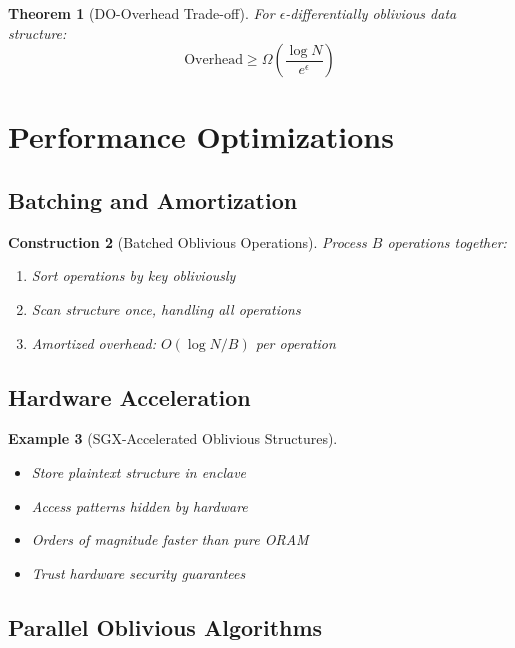 \documentclass[11pt,final]{article}
\newtheorem{theorem}{Theorem}[section]
\newtheorem{example}[theorem]{Example}
\newtheorem{construction}[theorem]{Construction}
\begin{document}
\begin{theorem}[DO-Overhead Trade-off]
For $\epsilon$-differentially oblivious data structure:
\begin{equation}
\text{Overhead} \geq \Omega\left(\frac{\log N}{e^\epsilon}\right)
\end{equation}
\end{theorem}

\section{Performance Optimizations}

\subsection{Batching and Amortization}

\begin{construction}[Batched Oblivious Operations]
Process $B$ operations together:
\begin{enumerate}
    \item Sort operations by key obliviously
    \item Scan structure once, handling all operations
    \item Amortized overhead: $O(\log N / B)$ per operation
\end{enumerate}
\end{construction}

\subsection{Hardware Acceleration}

\begin{example}[SGX-Accelerated Oblivious Structures]
\begin{itemize}
    \item Store plaintext structure in enclave
    \item Access patterns hidden by hardware
    \item Orders of magnitude faster than pure ORAM
    \item Trust hardware security guarantees
\end{itemize}
\end{example}

\subsection{Parallel Oblivious Algorithms}
\end{document}
